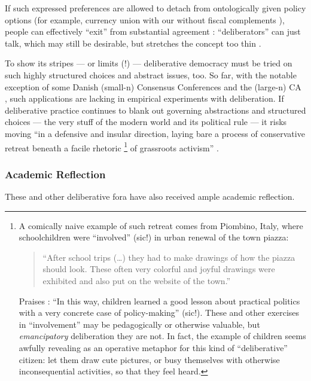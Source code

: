 If such expressed preferences are allowed to detach from ontologically given policy options (for example, currency union with our without fiscal complements \citealt{Mundell1961}), people can effectively ``exit'' from substantial agreement \citep[377]{Landwehr2010}: ``deliberators'' can just talk, which may still be desirable, but stretches the concept too thin \citep[502]{Thompson2008}.

To show its stripes --- or limits (!) --- deliberative democracy must be tried on such highly structured choices and abstract issues, too.
So far, with the notable exception of some Danish (small-n) Consensus Conferences and the (large-n) \gls{CA} \citep[on its complexity,][]{Blais2008}, such applications are lacking in empirical experiments with deliberation. 
If deliberative practice continues to blank out governing abstractions and structured choices --- the very stuff of the modern world and its political rule --- it risks moving ``in a defensive and insular direction, laying bare a process of conservative retreat beneath a facile rhetoric 
\footnote{
	A comically naive example of such retreat comes from  Piombino, Italy, where schoolchildren were ``involved'' (sic!) in urban renewal of the town piazza: 
	\begin{quote}
		``After school trips (\ldots) they had to make drawings of how the piazza should look. 
		These often very colorful and joyful drawings were exhibited and also put on the website of the town.''
	\end{quote}
	Praises \citealt[29]{Steiner2012}: ``In this way, children learned a good lesson about practical politics with a very concrete case of policy-making'' (sic!).
	These and other exercises in ``involvement'' may be pedagogically or otherwise valuable, but \emph{emancipatory} deliberation they are not.
	In fact, the example of children seems awfully revealing as an operative metaphor for this kind of ``deliberative'' citizen: let them draw cute pictures, or busy themselves with otherwise inconsequential activities, so that they feel heard.
}
of grassroots activism'' \citep[759]{Boggs-1997-aa}.

\subsubsection{Academic Reflection}
These and other deliberative fora have also received ample academic reflection.

